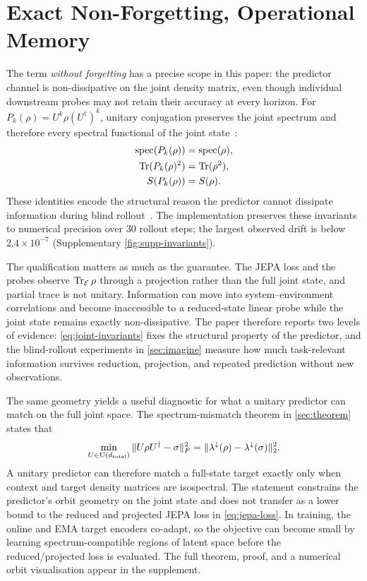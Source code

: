 \section{Exact Non-Forgetting, Operational Memory}
\label{sec:nonforget}

The term \emph{without forgetting} has a precise scope in this paper:
the predictor channel is non-dissipative on the joint density matrix,
even though individual downstream probes may not retain their accuracy
at every horizon. For $P_k(\rho)=U^k\rho(U^\dagger)^k$, unitary
conjugation preserves the joint spectrum and therefore every spectral
functional of the joint state~\cite{nielsen2010quantum}:
\begin{equation}
  \begin{aligned}
  \mathrm{spec}(P_k(\rho))&=\mathrm{spec}(\rho),\\
  \operatorname{Tr}(P_k(\rho)^2)&=\operatorname{Tr}(\rho^2),\\
  S(P_k(\rho))&=S(\rho).
  \end{aligned}
  \label{eq:joint-invariants}
\end{equation}
These identities encode the structural reason the predictor cannot
dissipate information during blind
rollout~\cite{nielsen2010quantum,baker2022quantum}.
The implementation preserves these invariants to numerical precision
over $30$ rollout steps; the largest observed drift is below
$2.4\times 10^{-7}$ (Supplementary \cref{fig:supp-invariants}).

The qualification matters as much as the guarantee. The JEPA loss and
the probes observe $\operatorname{Tr}_{\mathcal{E}}\rho$ through a projection rather than
the full joint state, and partial trace is not unitary. Information can
move into system--environment correlations and become inaccessible to a
reduced-state linear probe while the joint state remains exactly
non-dissipative. The paper therefore reports two levels of evidence:
\cref{eq:joint-invariants} fixes the structural property of the
predictor, and the blind-rollout experiments in \cref{sec:imagine}
measure how much task-relevant information survives reduction,
projection, and repeated prediction without new observations.

The same geometry yields a useful diagnostic for what a unitary
predictor can match on the full joint space. The spectrum-mismatch
theorem in \cref{sec:theorem} states that
\begin{equation}
  \min_{U\in \mathrm{U}(d_{\text{total}})}
  \|U\rho U^\dagger-\sigma\|_F^2
  =
  \|\lambda^\downarrow(\rho)-\lambda^\downarrow(\sigma)\|_2^2.
  \label{eq:spectrum-mismatch-short}
\end{equation}
A unitary predictor can therefore match a full-state target exactly
only when context and target density matrices are isospectral. The
statement constrains the predictor's orbit geometry on the joint state
and does not transfer as a lower bound to the reduced and projected
JEPA loss in \cref{eq:jepa-loss}. In training, the online and EMA
target encoders co-adapt, so the objective can become small by learning
spectrum-compatible regions of latent space before the
reduced/projected loss is evaluated. The full theorem, proof, and a
numerical orbit visualisation appear in the supplement.
